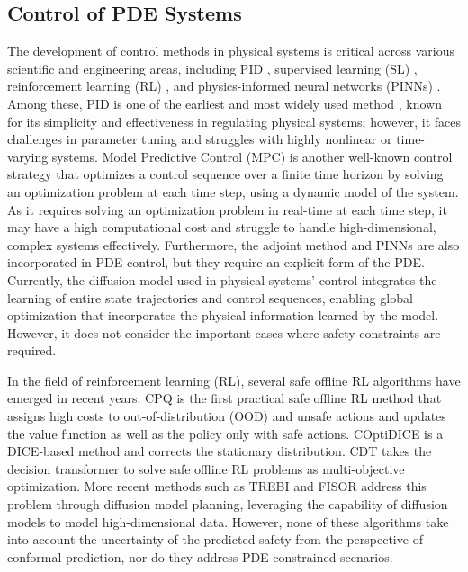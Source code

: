 \subsection{Control of PDE Systems}
The development of control methods in physical systems is critical across various scientific and engineering areas, including PID \citep{1580152}, supervised learning (SL) \citep{holl2020learning,hwang2022solving}, reinforcement learning (RL) \citep{farahmand2017deep, pan2018reinforcement, rabault2019artificial}, and physics-informed neural networks (PINNs) \citep{mowlavi2023optimal}. Among these, PID is one of the earliest and most widely used method \citep{johnson2005pid}, known for its simplicity and effectiveness in regulating physical systems; however, it faces challenges in parameter tuning and struggles with highly nonlinear or time-varying systems. Model Predictive Control (MPC) \cite{garcia1989model,findeisen2002introduction,schwenzer2021review} is another well-known control strategy that optimizes a control sequence over a finite time horizon by solving an optimization problem at each time step, using a dynamic model of the system. As it requires solving an optimization problem in real-time at each time step, it may have a high computational cost and struggle to handle high-dimensional, complex systems effectively.
Furthermore, the adjoint method \citep{protas2008adjoint} and PINNs \citep{mowlavi2023optimal} are also incorporated in PDE control, but they require an explicit form of the PDE. Currently, the diffusion model used in physical systems' control \citep{wei2024generative, hu2024wavelet} integrates the learning of entire state trajectories and control sequences, enabling global optimization that incorporates the physical information learned by the model. However, it does not consider the important cases where safety constraints are required. 

In the field of reinforcement learning (RL), several safe offline RL algorithms have emerged in recent years. CPQ \citep{xu2022constraints} is the first practical safe offline RL method that assigns high costs to out-of-distribution (OOD) and unsafe actions and updates the value function as well as the policy only with safe actions. COptiDICE \citep{lee2022coptidice} is a DICE-based method and corrects the stationary distribution. CDT \citep{liu2023constrained} takes the decision transformer to solve safe offline RL problems as multi-objective optimization. More recent methods such as TREBI \citep{lin2023safe} and FISOR \citep{zheng2024safe} address this problem through diffusion model planning, leveraging the capability of diffusion models to model high-dimensional data. However, none of these algorithms take into account the uncertainty of the predicted safety from the perspective of conformal prediction, nor do they address PDE-constrained scenarios.


